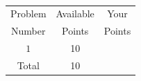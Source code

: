 \documentclass[]{exam}
\numberwithin{equation}{section}
\begin{document}
\clearpage
\normalsize
\
\vspace{.5cm}

\huge
\begin{center}
\begin{tabular}{|c|c|c|}
\hline
Problem  & Available  &   Your  \\
Number & Points &    Points  \\	\hline\hline

 $1$  & 10  &   \\	\hline

Total & 10  & \\ \hline
\end{tabular}
\end{center}

\pagebreak
\end{document}
